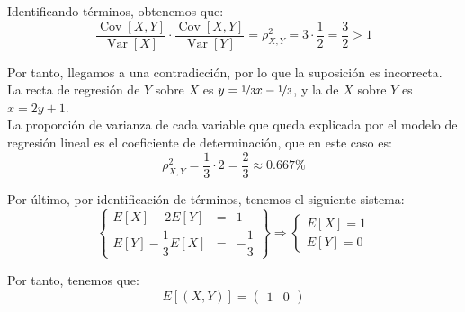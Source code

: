 \documentclass[12pt]{article}
\DeclareMathOperator{\Var}{Var}
\DeclareMathOperator{\Cov}{Cov}
\begin{document}
\begin{ejercicio}[3 puntos]
\begin{enumerate}
            Identificando términos, obtenemos que:
            \begin{equation*}
                \dfrac{\Cov[X,Y]}{\Var[X]}\cdot \dfrac{\Cov[X,Y]}{\Var[Y]} = \rho_{X,Y}^2 = 3\cdot \dfrac{1}{2} = \dfrac{3}{2}>1
            \end{equation*}

            Por tanto, llegamos a una contradicción, por lo que la suposición es incorrecta. La recta de regresión de $Y$ sobre $X$ es $y=\nicefrac{1}{3}x-\nicefrac{1}{3}$, y la de $X$ sobre $Y$ es $x=2y+1$.\\

            La proporción de varianza de cada variable que queda explicada por el modelo de regresión lineal es el coeficiente de determinación, que en este caso es:
            \begin{equation*}
                \rho_{X,Y}^2 = \dfrac{1}{3}\cdot 2=\dfrac{2}{3}\approx 0.667\%
            \end{equation*}

            Por último, por identificación de términos, tenemos el siguiente sistema:
            \begin{equation*}
                \left\{\begin{array}{rcl}
                    E[X]-2E[Y]&=&1 \\
                    E[Y]-\dfrac{1}{3}E[X]&=&-\dfrac{1}{3}
                \end{array}\right\}
                \Longrightarrow
                \begin{cases}
                    E[X]=1 \\
                    E[Y]=0
                \end{cases}
            \end{equation*}

            Por tanto, tenemos que:
            \begin{equation*}
                E[(X,Y)] = \begin{pmatrix}
                    1 & 0
                \end{pmatrix}
            \end{equation*}
        \end{enumerate}
    \end{ejercicio}
\end{document}

